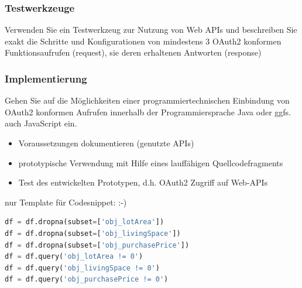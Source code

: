 \documentclass[notitlepage, hidelinks]{article}
\begin{document}
\subsubsection{Testwerkzeuge}
Verwenden Sie ein Testwerkzeug zur Nutzung von Web APIs und beschreiben Sie exakt die Schritte und Konfigurationen von mindestens 3 OAuth2 konformen Funktionsaufrufen (request), sie deren erhaltenen Antworten (response)

\subsubsection{Implementierung}
Gehen Sie auf die Möglichkeiten einer programmiertechnischen Einbindung von OAuth2 konformen Aufrufen innerhalb der Programmiersprache Java oder ggfs. auch JavaScript ein. 
\begin{itemize}
\item Voraussetzungen dokumentieren (genutzte APIs)
\item prototypische Verwendung mit Hilfe eines lauffähigen Quellcodefragments
\item Test des entwickelten Prototypen, d.h. OAuth2 Zugriff auf Web-APIs
\end{itemize}


nur Template für Codesnippet: :-)

\begin{lstlisting}[language=Python,frame=single,caption=Filtern von nan- und 0-values,label=cone]
df = df.dropna(subset=['obj_lotArea'])
df = df.dropna(subset=['obj_livingSpace'])
df = df.dropna(subset=['obj_purchasePrice'])
df = df.query('obj_lotArea != 0')
df = df.query('obj_livingSpace != 0')
df = df.query('obj_purchasePrice != 0')
\end{lstlisting}

\newpage




\end{document}
